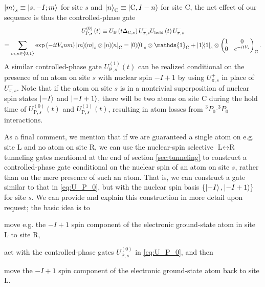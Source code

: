 \documentclass[aps,nofootinbib,notitlepage,11pt]{revtex4-1}
\renewcommand{\t}{\text} %
\newcommand{\p}[1]{\left(#1\right)} %
\renewcommand{\set}[1]{\left\{#1\right\}} %
\renewcommand{\L}{\text{L}}
\newcommand{\C}{\text{C}}
\newcommand{\R}{\text{R}}
\newcommand{\B}{\text{B}}
\renewcommand{\P}{\text{P}}
\newcommand{\1}{\mathds{1}}
\begin{document}
$\ket{m}_s\equiv\ket{s,-I;m}$ for site $s$ and
$\ket{n}_\C\equiv\ket{\C,I-n}$ for site $\C$, the net effect of our
sequence is thus the controlled-phase gate
\begin{multline}
  U_{\P,s}^{(0)}\p{t}
  \equiv U_\B\p{t\Delta_{\C,s}}
  U_{\pi,s}^- U_{\t{hold}}\p{t} U_{\pi,s}^- \\
  = \sum_{m,n\in\set{0,1}} \exp\p{-itV_snm} \op{m}_s\otimes\op{n}_\C
  = \op{0}_s \otimes \1_\C + \op{1}_s \otimes
  \begin{pmatrix}
    1 & 0 \\ 0 & e^{-itV_s}
  \end{pmatrix}_\C.
  \label{eq:U_P_0}
\end{multline}
A similar controlled-phase gate $U_{\P,s}^{(1)}\p{t}$ can be realized
conditional on the presence of an atom on site $s$ with nuclear spin
$-I+1$ by using $U_{\pi,s}^+$ in place of $U_{\pi,s}^-$.  Note that if
the atom on site $s$ is in a nontrivial superposition of nuclear spin
states $\ket{-I}$ and $\ket{-I+1}$, there will be two atoms on site
$\C$ during the hold time of $U_{\P,s}^{(0)}\p{t}$ and
$U_{\P,s}^{(1)}\p{t}$, resulting in atom losses from
${}^3P_0$-${}^3P_0$ interactions.

As a final comment, we mention that if we are guaranteed a single atom
on e.g.  site $\L$ and no atom on site $\R$, we can use the
nuclear-spin selective $\L\leftrightarrow\R$ tunneling gates mentioned
at the end of section \ref{sec:tunneling} to construct a
controlled-phase gate conditional on the nuclear spin of an atom on
site $s$, rather than on the mere presence of such an atom.  That is,
we can construct a gate similar to that in \eqref{eq:U_P_0}, but with
the nuclear spin basis $\set{\ket{-I},\ket{-I+1}}$ for site $s$.  We
can provide and explain this construction in more detail upon request;
the basic idea is to
\begin{enumerate*}[label=(\roman*)]
\item move e.g. the $-I+1$ spin component of the electronic
  ground-state atom in site $\L$ to site $\R$,
\item act with the controlled-phase gates $U_{\P,s}^{(0)}$ in
  \eqref{eq:U_P_0}, and then
\item move the $-I+1$ spin component of the electronic ground-state
  atom back to site $\L$.
\end{enumerate*}
\end{document}
